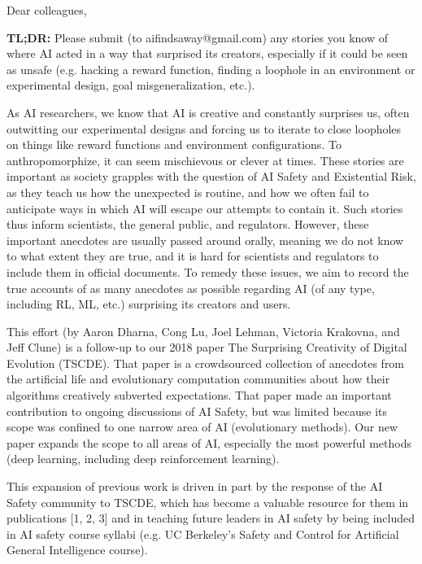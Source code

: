 \begin{mdframed}[
    backgroundcolor=black!2,
    linecolor=black!35,
    linewidth=0.8pt,
    roundcorner=4pt,
    innertopmargin=10pt,
    innerbottommargin=10pt,
    innerleftmargin=12pt,
    innerrightmargin=12pt,
    skipabove=\baselineskip,
    skipbelow=\baselineskip
]
\small

Dear colleagues,

\textbf{TL;DR:} Please submit (to aifindsaway@gmail.com) any stories you know of where AI acted in a way that surprised its creators, especially if it could be seen as unsafe (e.g. hacking a reward function, finding a loophole in an environment or experimental design, goal misgeneralization, etc.).

As AI researchers, we know that AI is creative and constantly surprises us, often outwitting our experimental designs and forcing us to iterate to close loopholes on things like reward functions and environment configurations. To anthropomorphize, it can seem mischievous or clever at times. These stories are important as society grapples with the question of AI Safety and Existential Risk, as they teach us how the unexpected is routine, and how we often fail to anticipate ways in which AI will escape our attempts to contain it. Such stories thus inform scientists, the general public, and regulators. However, these important anecdotes are usually passed around orally, meaning we do not know to what extent they are true, and it is hard for scientists and regulators to include them in official documents. To remedy these issues, we aim to record the true accounts of as many anecdotes as possible regarding AI (of any type, including RL, ML, etc.) surprising its creators and users.

This effort (by Aaron Dharna, Cong Lu, Joel Lehman, Victoria Krakovna, and Jeff Clune) is a follow-up to our 2018 paper The Surprising Creativity of Digital Evolution (TSCDE). That paper is a crowdsourced collection of anecdotes from the artificial life and evolutionary computation communities about how their algorithms creatively subverted expectations. That paper made an important contribution to ongoing discussions of AI Safety, but was limited because its scope was confined to one narrow area of AI (evolutionary methods). Our new paper expands the scope to all areas of AI, especially the most powerful methods (deep learning, including deep reinforcement learning).

This expansion of previous work is driven in part by the response of the AI Safety community to TSCDE, which has become a valuable resource for them in publications [1, 2, 3] and in teaching future leaders in AI safety by being included in AI safety course syllabi (e.g. UC Berkeley's Safety and Control for Artificial General Intelligence course).


\end{mdframed}
